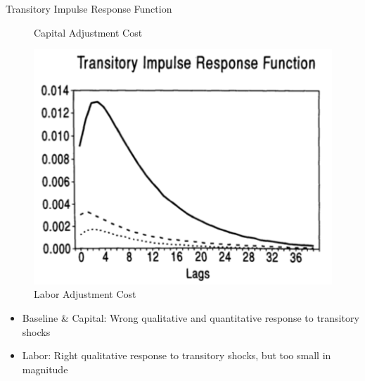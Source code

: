 \documentclass[10pt]{beamer}
\begin{document}
\begin{frame}{Transitory Impulse Response Function}
\begin{minipage}{0.33\textwidth}
\begin{figure}
            \caption{Capital Adjustment Cost}
        \end{figure}
    \end{minipage}%
    \begin{minipage}{0.33\textwidth}
        \begin{figure}
            \centering
            \includegraphics[width=\linewidth]{figures/L_trans_IRF.png}
            \caption{Labor Adjustment Cost}
        \end{figure}
    \end{minipage}
    \begin{itemize}
        \item Baseline \& Capital: Wrong qualitative and quantitative response to transitory
              shocks
        \item Labor: Right qualitative response to transitory shocks, but too small in
              magnitude
    \end{itemize}

\end{frame}
\end{document}
